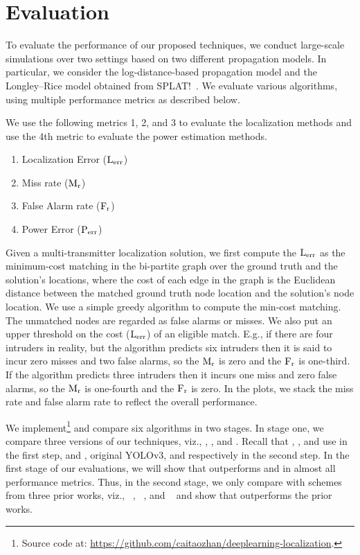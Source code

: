 \section{\bf Evaluation}
\label{sec:evaluation}

To evaluate the performance of our proposed techniques, we conduct large-scale simulations over
two settings based on two different propagation models. In particular, we consider the log-distance-based
propagation model and the Longley--Rice model obtained from SPLAT!~\cite{splat}. We evaluate various 
algorithms, using multiple performance metrics as described below. 

 We use the following metrics 1, 2, and 3 to evaluate the localization methods and use the 4th metric to evaluate the power estimation methods.
\begin{enumerate}
    \item Localization Error ($\mathrm{L_{err}}$)
    \item Miss rate ($\mathrm{M_{r}}$)
    \item False Alarm rate ($\mathrm{F_{r}}$)
    \item Power Error ($\mathrm{P_{err}}$)
\end{enumerate}
Given a multi-transmitter localization solution, we first compute the $\mathrm{L_{err}}$ as
the minimum-cost matching in the bi-partite graph over the
ground truth and the solution's locations, where the cost of each edge in the graph is the Euclidean distance between the matched ground truth node location and the solution's node location.
We use a simple greedy algorithm to compute the min-cost matching.
The unmatched nodes are regarded as false alarms or misses. 
We also put an upper threshold on the cost ($\mathrm{L_{err}}$) of an eligible match. 
E.g., if there are four intruders in reality, but the algorithm predicts six
intruders then it is said to incur zero misses and two false alarms, so the $\mathrm{M_{r}}$ is zero and the $\mathrm{F_{r}}$ is one-third. 
If the algorithm predicts three intruders then it incurs one miss and zero false alarms, so the $\mathrm{M_{r}}$ is one-fourth and the $\mathrm{F_{r}}$ is zero.
In the plots, we stack the miss rate and false alarm rate to reflect the overall performance.


We implement\footnote{Source code at: \url{https://github.com/caitaozhan/deeplearning-localization}.} and compare six algorithms in two stages. In stage one, we compare three versions of our
techniques, viz., \our, \ouryolo, and \ourpeak.  Recall that \our, \ouryolo, and \ourpeak 
use \imgimg in the first step, and \yolocust, original YOLOv3, and \simpeak respectively in the second step. In the first stage of our evaluations, we will show that 
\our outperforms \ouryolo and \ourpeak in almost all performance metrics. 
Thus, in the second stage, we only compare \our with
schemes from three prior works, viz., \splot~\cite{mobicom17-splot}, \deeptx~\cite{icccn20-deeptxfinder},
and \map~\cite{ipsn20-mtl} and show that \our outperforms the prior works.

